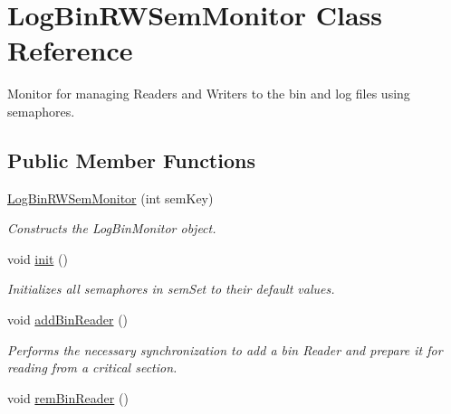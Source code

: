 \hypertarget{classLogBinRWSemMonitor}{\section{Log\-Bin\-R\-W\-Sem\-Monitor Class Reference}
\label{classLogBinRWSemMonitor}
}


Monitor for managing Readers and Writers to the bin and log files using semaphores.  


\subsection*{Public Member Functions}
\begin{DoxyCompactItemize}
\item 
\hyperlink{classLogBinRWSemMonitor_ae328b2edbd8862b20980450d33b45ffc}{Log\-Bin\-R\-W\-Sem\-Monitor} (int sem\-Key)
\begin{DoxyCompactList}\small\item\em Constructs the Log\-Bin\-Monitor object. \end{DoxyCompactList}\item 
\hypertarget{classLogBinRWSemMonitor_afd102da36da0e3185fd0c4895228efb4}{void \hyperlink{classLogBinRWSemMonitor_afd102da36da0e3185fd0c4895228efb4}{init} ()}\label{classLogBinRWSemMonitor_afd102da36da0e3185fd0c4895228efb4}

\begin{DoxyCompactList}\small\item\em Initializes all semaphores in sem\-Set to their default values. \end{DoxyCompactList}\item 
\hypertarget{classLogBinRWSemMonitor_aaeb20231cb1c0428970ee8443ec498ce}{void \hyperlink{classLogBinRWSemMonitor_aaeb20231cb1c0428970ee8443ec498ce}{add\-Bin\-Reader} ()}\label{classLogBinRWSemMonitor_aaeb20231cb1c0428970ee8443ec498ce}

\begin{DoxyCompactList}\small\item\em Performs the necessary synchronization to add a bin Reader and prepare it for reading from a critical section. \end{DoxyCompactList}\item 
\hypertarget{classLogBinRWSemMonitor_a3450b5c16b4064d21e06c75cfc793ef6}{void \hyperlink{classLogBinRWSemMonitor_a3450b5c16b4064d21e06c75cfc793ef6}{rem\-Bin\-Reader} ()}\label{classLogBinRWSemMonitor_a3450b5c16b4064d21e06c75cfc793ef6}


\end{DoxyCompactItemize}

